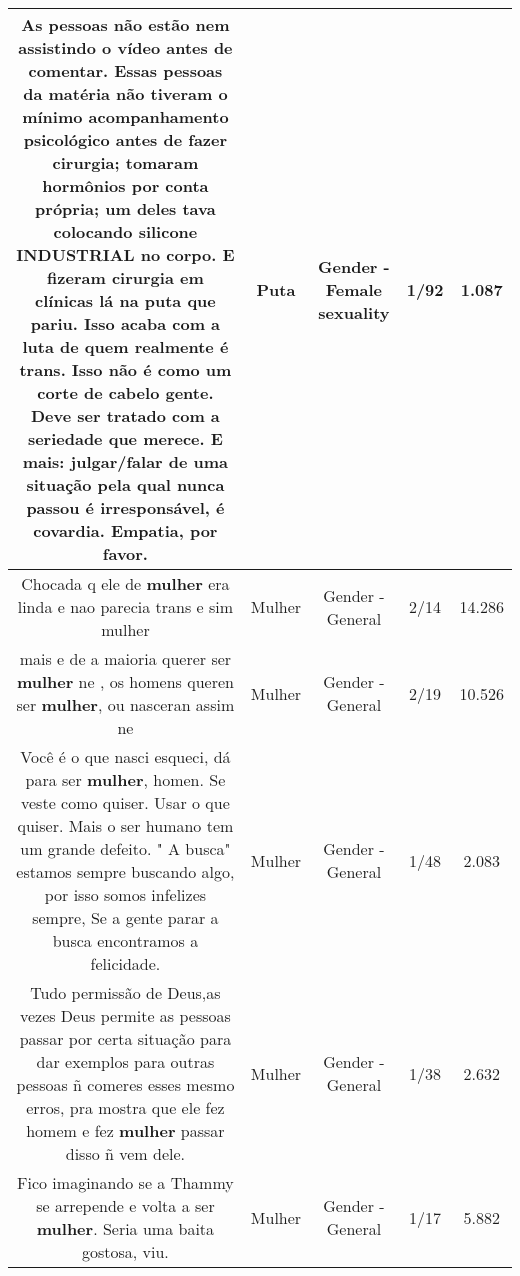 \documentclass[11pt]{article}
\newlength\mylength
\begin{document}
\begin{center}
\begin{longtable}{|C{.65\mylength}|C{.30\mylength}|C{.12\mylength}|C{.12\mylength}|C{.12\mylength}|}
  \small As pessoas não estão nem assistindo o vídeo antes de comentar. Essas pessoas da matéria não tiveram o mínimo acompanhamento psicológico antes de fazer cirurgia; tomaram hormônios por conta própria; um deles tava colocando silicone INDUSTRIAL no corpo. E fizeram cirurgia em clínicas lá na \textbf{puta} que pariu. Isso acaba com a luta de quem realmente é trans. Isso não é como um corte de cabelo gente. Deve ser tratado com a seriedade que merece. E mais: julgar/falar de uma situação pela qual nunca passou é irresponsável, é covardia. Empatia, por favor.\normalsize   & Puta & Gender - Female sexuality & 1/92 & 1.087 \\  \hline
  \small Chocada q ele de \textbf{mulher} era linda e nao parecia trans e sim mulher\normalsize   & Mulher & Gender - General & 2/14 & 14.286 \\  \hline
  \small mais e de a maioria querer ser \textbf{mulher} ne , os homens queren ser \textbf{mulher},  ou nasceran assim  ne\normalsize   & Mulher & Gender - General & 2/19 & 10.526 \\  \hline
  \small Você é o que nasci esqueci, dá para ser \textbf{mulher}, homen. Se veste como quiser. Usar o que quiser. Mais o ser humano tem um grande defeito. " A busca" estamos sempre buscando algo, por isso somos infelizes sempre, Se a gente parar a busca encontramos a felicidade.\normalsize   & Mulher & Gender - General & 1/48 & 2.083 \\  \hline
  \small Tudo permissão de Deus,as vezes Deus  permite as pessoas passar por certa situação para dar exemplos para outras pessoas ñ comeres esses mesmo erros, pra mostra que ele fez homem e fez \textbf{mulher} passar disso ñ vem dele.\normalsize   & Mulher & Gender - General & 1/38 & 2.632 \\  \hline
  \small Fico imaginando se a Thammy se arrepende e volta a ser \textbf{mulher}. Seria uma baita gostosa, viu.\normalsize   & Mulher & Gender - General & 1/17 & 5.882 \\  \hline

\end{longtable}
\end{center}
\end{document}
